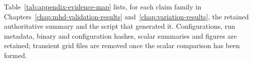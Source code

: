 Table~\ref{tab:appendix-evidence-map} lists, for each claim family in
Chapters~\ref{chap:mhd-validation-results} and~\ref{chap:variation-results},
the retained authoritative summary and the script that generated it.
Configurations, run metadata, binary and configuration hashes, scalar
summaries and figures are retained; transient grid files are removed once the
scalar comparison has been formed.


